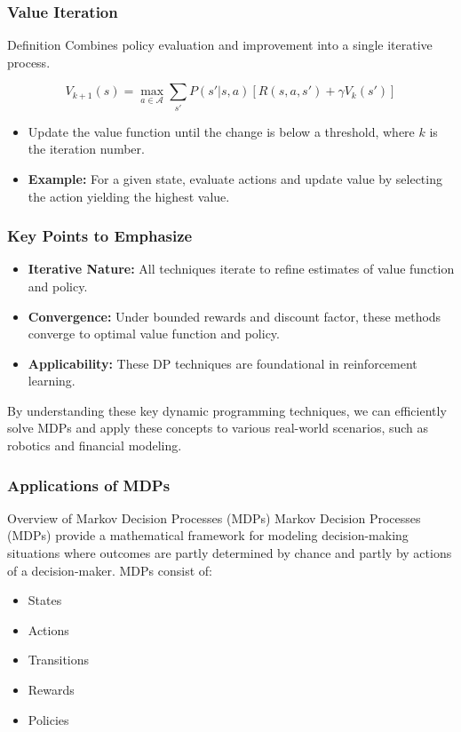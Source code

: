 \documentclass[aspectratio=169]{beamer}
\begin{document}
\begin{frame}[fragile]
  \frametitle{Value Iteration}
  \begin{block}{Definition}
    Combines policy evaluation and improvement into a single iterative process.
  \end{block}

  \begin{equation}
  V_{k+1}(s) = \max_{a \in \mathcal{A}} \sum_{s'} P(s'|s,a) [R(s,a,s') + \gamma V_k(s')]
  \end{equation}

  \begin{itemize}
    \item Update the value function until the change is below a threshold, where $k$ is the iteration number.
    \item \textbf{Example:} For a given state, evaluate actions and update value by selecting the action yielding the highest value.
  \end{itemize}
\end{frame}

\begin{frame}[fragile]
  \frametitle{Key Points to Emphasize}
  \begin{itemize}
    \item \textbf{Iterative Nature:} All techniques iterate to refine estimates of value function and policy.
    \item \textbf{Convergence:} Under bounded rewards and discount factor, these methods converge to optimal value function and policy.
    \item \textbf{Applicability:} These DP techniques are foundational in reinforcement learning.
  \end{itemize}
  
  By understanding these key dynamic programming techniques, we can efficiently solve MDPs and apply these concepts to various real-world scenarios, such as robotics and financial modeling.
\end{frame}

\begin{frame}[fragile]
    \frametitle{Applications of MDPs}
    \begin{block}{Overview of Markov Decision Processes (MDPs)}
        Markov Decision Processes (MDPs) provide a mathematical framework for modeling decision-making situations where outcomes are partly determined by chance and partly by actions of a decision-maker. MDPs consist of:
        \begin{itemize}
            \item States
            \item Actions
            \item Transitions
            \item Rewards
            \item Policies
        \end{itemize}
    \end{block}
\end{frame}
\end{document}
